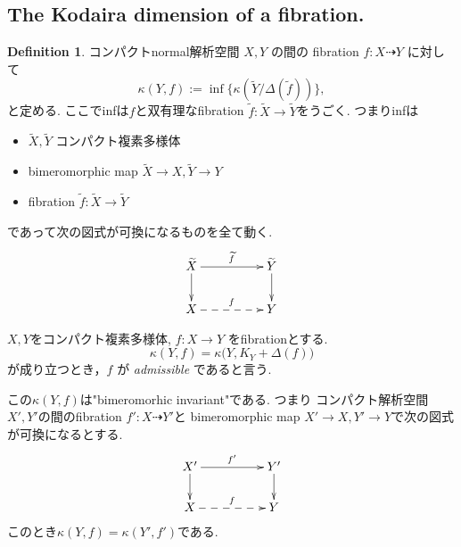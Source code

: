 \documentclass[dvipdfmx,a4paper,11pt]{article} %
\theoremstyle{definition}
\newtheorem{defn}[thm]{Definition}
\theoremstyle{remark}
\numberwithin{equation}{section}
\begin{document}
\subsection{The Kodaira dimension of a fibration. \cite[1.3]{Cam04}}

\begin{defn}\cite[Definition 1.7]{Cam04}
コンパクトnormal解析空間 \(X, Y\) の間の
fibration \(f : X \dashrightarrow Y\) に対して
\[
\kappa(Y,f) := \inf\{\kappa(\widetilde{Y}/\Delta(\widetilde{f}))\},
\]
と定める.
ここでinfは$f$と双有理なfibration $\widetilde{f} : \widetilde{X} \to \widetilde{Y}$をうごく. 
つまりinfは
\begin{itemize}
\item $\widetilde{X}, \widetilde{Y}$ コンパクト複素多様体
\item bimeromorphic map $\widetilde{X} \to X, \widetilde{Y} \to Y$
\item fibration $\widetilde{f} : \widetilde{X} \to \widetilde{Y}$
\end{itemize}
であって次の図式が可換になるものを全て動く. 
  \[
\xymatrix@C=50pt@R=20pt{
\widetilde{X}  \ar@{->}[d]\ar@{->}[r]^{\widetilde{f}} &\widetilde{Y} \ar@{->}[d]\\
 X\ar@{-->}[r]^{f} & Y\\
}
\]

$X, Y$をコンパクト複素多様体, \(f : X \to Y\) をfibrationとする. 
\[
\kappa(Y,f) = \kappa\bigl(Y, K_Y + \Delta(f)\bigr)
\]
が成り立つとき，\(f\) が \emph{admissible} であると言う. 
\end{defn}

この$\kappa(Y,f) $は"bimeromorhic invariant"である. つまり
コンパクト解析空間 \(X', Y'\)の間のfibration $f' : X \dashrightarrow Y'$と
bimeromorphic map $X' \to X, Y' \to Y$で次の図式が可換になるとする. 
  \[
\xymatrix@C=50pt@R=20pt{
X'  \ar@{->}[d]\ar@{->}[r]^{f'} &Y'\ar@{->}[d]\\
 X\ar@{-->}[r]^{f} & Y\\
}
\]
このとき$\kappa(Y,f)  = \kappa(Y',f') $である. 
\end{document}
